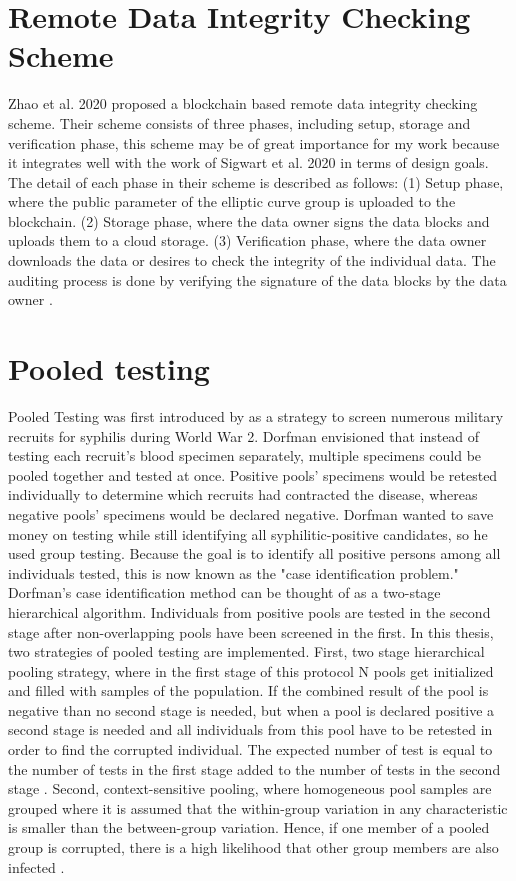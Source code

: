 \section{Remote Data Integrity Checking Scheme}
Zhao et al. 2020 proposed a blockchain based remote data integrity checking scheme. Their scheme consists of three phases, including setup, storage and verification phase, this scheme may be of great importance for my work because it integrates well with the work of Sigwart et al. 2020 in terms of design goals. The detail of each phase in their scheme is described as follows: (1) Setup phase, where the public parameter of the elliptic curve group is uploaded to the blockchain. (2) Storage phase, where the data owner signs the data blocks and uploads them to a cloud storage. (3) Verification phase, where the data owner downloads the data or desires to check the integrity of the individual data. The auditing process is done by verifying the signature of the data blocks by the data owner \cite[1]{zhao2020blockchain}.

\section{Pooled testing}\label{sec:pooled}
Pooled Testing was first introduced by \cite{dorfman1943detection} as a strategy to screen numerous military recruits for syphilis during World War 2. Dorfman envisioned that instead of testing each recruit's blood specimen separately, multiple specimens could be pooled together and tested at once. Positive pools' specimens would be retested individually to determine which recruits had contracted the disease, whereas negative pools' specimens would be declared negative. Dorfman wanted to save money on testing while still identifying all syphilitic-positive candidates, so he used group testing. Because the goal is to identify all positive persons among all individuals tested, this is now known as the "case identification problem." Dorfman's case identification method can be thought of as a two-stage hierarchical algorithm. Individuals from positive pools are tested in the second stage after non-overlapping pools have been screened in the first.
In this thesis, two strategies of pooled testing are implemented. 
First, two stage hierarchical pooling strategy, where in the first stage of this protocol N pools get initialized and filled with samples of the population. If the combined result of the pool is negative than no second stage is needed, but when a pool is declared positive a second stage is needed and all individuals from this pool have to be retested in order to find the corrupted individual. The expected number of test is equal to the number of tests in the first stage added to the number of tests in the second stage \cite[3]{nianogo2021optimal}.
Second, context-sensitive pooling, where homogeneous pool samples are grouped where it is assumed that the within-group variation in any characteristic is smaller than the between-group variation. Hence, if one member of a pooled group is corrupted, there is a high likelihood that other group members are also infected \cite[3]{deckert2020simulation}.

